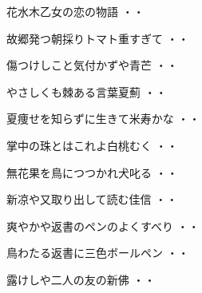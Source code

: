 \vspace{0.6cm}
\begin{shiika}花水木乙女の恋の物語
\hfill{・・}\end{shiika}
\vspace{0.6cm}
\begin{shiika}故郷発つ朝採りトマト重すぎて
\hfill{・・}\end{shiika}
\vspace{0.6cm}
\begin{shiika}傷つけしこと気付かずや青芒
\hfill{・・}\end{shiika}
\vspace{0.6cm}
\begin{shiika}やさしくも棘ある言葉夏薊
\hfill{・・}\end{shiika}
\vspace{0.6cm}
\begin{shiika}夏痩せを知らずに生きて米寿かな
\hfill{・・}\end{shiika}
\vspace{0.6cm}
\begin{shiika}掌中の珠とはこれよ白桃むく
\hfill{・・}\end{shiika}
\vspace{0.6cm}
\begin{shiika}無花果を鳥につつかれ犬叱る
\hfill{・・}\end{shiika}
\vspace{0.6cm}
\begin{shiika}新凉や又取り出して読む佳信
\hfill{・・}\end{shiika}
\vspace{0.6cm}
\begin{shiika}爽やかや返書のペンのよくすべり
\hfill{・・}\end{shiika}
\vspace{0.6cm}
\begin{shiika}鳥わたる返書に三色ボールペン
\hfill{・・}\end{shiika}
\vspace{0.6cm}
\begin{shiika}露けしや二人の友の新佛
\hfill{・・}\end{shiika}
